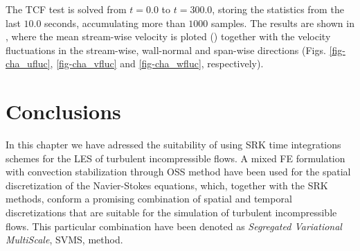 The TCF test is solved from $ t=0.0 $ to $ t=300.0 $, storing the statistics from the last $ 10.0 $ seconds, accumulating more than $ 1000 $ samples. The results are shown in , where the mean stream-wise velocity is ploted () together with the velocity fluctuations in the stream-wise, wall-normal and span-wise directions (Figs. \ref{fig-cha_ufluc}, \ref{fig-cha_vfluc} and \ref{fig-cha_wfluc}, respectively).
%
%

\section{Conclusions}
\label{sec-C7_conclusions}
In this chapter we have adressed the suitability of using SRK time integrations schemes for the LES of turbulent incompressible flows. A mixed FE formulation with convection stabilization through OSS method have been used for the spatial discretization of the Navier-Stokes equations, which, together with the SRK methods, conform a promising combination of spatial and temporal discretizations that are suitable for the simulation of turbulent incompressible flows. This particular combination have been denoted as \textit{Segregated Variational MultiScale}, SVMS, method.

